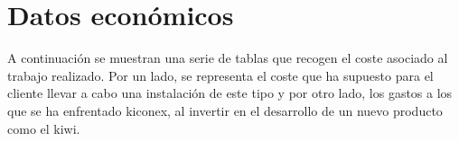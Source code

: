 
\cleardoublepage
\chapter{Datos económicos}

\label{chap:datosEconomicos} %

A continuación se muestran una serie de tablas que recogen el coste asociado al trabajo realizado. Por un lado, se representa el coste que ha supuesto para el cliente llevar a cabo una instalación de este tipo y por otro lado, los gastos a los que se ha enfrentado kiconex, al invertir en el desarrollo de un nuevo producto como el kiwi.

\vspace*{\fill}

